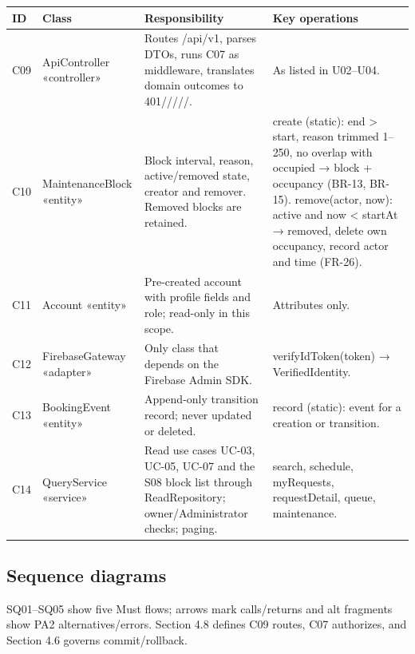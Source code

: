 \small
\setlength{\tabcolsep}{2pt}
\renewcommand{\arraystretch}{1.12}
\begin{longtable}{|>{\raggedright\arraybackslash}p{}|>{\raggedright\arraybackslash}p{}|>{\raggedright\arraybackslash}p{}|>{\raggedright\arraybackslash}p{}|}
\hline
\textbf{ID} & \textbf{Class} & \textbf{Responsibility} & \textbf{Key operations} \\ \hline
\endfirsthead \hline
C09 & ApiController\allowbreak{} «controller» & Routes /api/v1, parses DTOs, runs C07 as middleware, translates domain outcomes to 401/\allowbreak 403/\allowbreak 404/\allowbreak 409/\allowbreak 422/\allowbreak 503. & As listed in U02–U04. \\ \hline
C10 & MaintenanceBlock «entity» & Block interval, reason, active/removed state, creator and remover. Removed blocks are retained. & create (static): end > start, reason trimmed 1–250, no overlap with occupied → block + occupancy (BR-13, BR-15). remove(actor, now): active and now < startAt → removed, delete own occupancy, record actor and time (FR-26). \\ \hline
C11 & Account «entity» & Pre-created account with profile fields and role; read-only in this scope. & Attributes only. \\ \hline
C12 & FirebaseGateway «adapter» & Only class that depends on the Firebase Admin SDK. & verifyIdToken(token) → VerifiedIdentity. \\ \hline
C13 & BookingEvent «entity» & Append-only transition record; never updated or deleted. & record (static): event for a creation or transition. \\ \hline
C14 & QueryService «service» & Read use cases UC-03, UC-05, UC-07 and the S08 block list through ReadRepository; owner/Administrator checks; paging. & search, schedule, myRequests, requestDetail, queue, maintenance. \\ \hline
\end{longtable}
\normalsize

\subsection{Sequence diagrams}

SQ01–SQ05 show five Must flows; arrows mark calls/returns and alt fragments show PA2 alternatives/errors. Section 4.8 defines C09 routes, C07 authorizes, and Section 4.6 governs commit/rollback.\par

